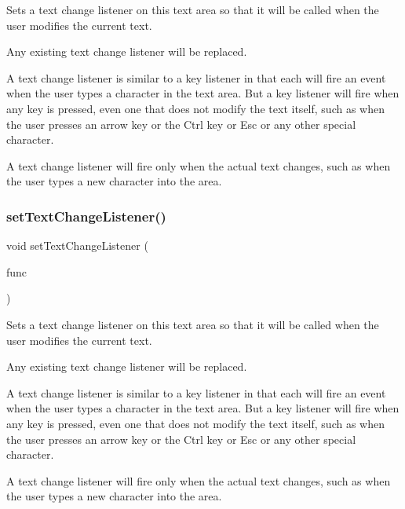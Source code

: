 Sets a text change listener on this text area so that it will be called when the user modifies the current text. 

Any existing text change listener will be replaced.

A text change listener is similar to a key listener in that each will fire an event when the user types a character in the text area. But a key listener will fire when any key is pressed, even one that does not modify the text itself, such as when the user presses an arrow key or the Ctrl key or Esc or any other special character.

A text change listener will fire only when the actual text changes, such as when the user types a new character into the area. \mbox{\label{classsgl_1_1GTextArea_ae8df75b0746951146d29220f386fcd33}} 
\subsubsection{\texorpdfstring{set\+Text\+Change\+Listener()}{setTextChangeListener()}\hspace{0.1cm}{\footnotesize\ttfamily [2/2]}}
{\footnotesize\ttfamily void set\+Text\+Change\+Listener (\begin{DoxyParamCaption}\item[{\mbox{\hyperlink{namespacesgl_a54427ce97bb1c2804e4fe2b0a62e8b17}{G\+Event\+Listener\+Void}}}]{func }\end{DoxyParamCaption})\hspace{0.3cm}{\ttfamily [virtual]}}



Sets a text change listener on this text area so that it will be called when the user modifies the current text. 

Any existing text change listener will be replaced.

A text change listener is similar to a key listener in that each will fire an event when the user types a character in the text area. But a key listener will fire when any key is pressed, even one that does not modify the text itself, such as when the user presses an arrow key or the Ctrl key or Esc or any other special character.

A text change listener will fire only when the actual text changes, such as when the user types a new character into the area. \mbox{\label{classsgl_1_1GInteractor_a039e0e49beaecc275efce02d416acea8}} 
